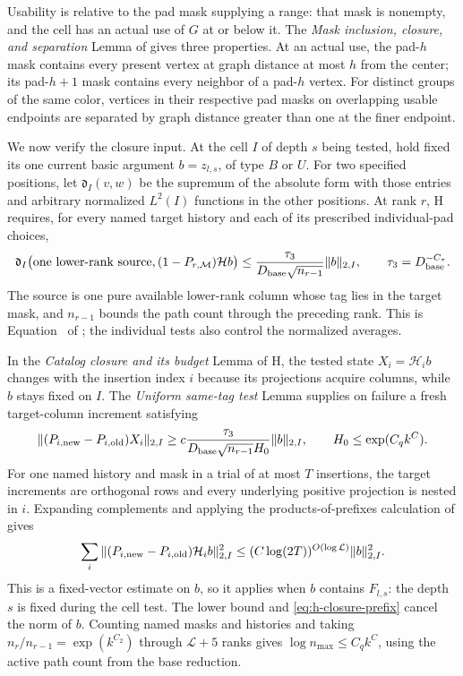 Usability is relative to the pad mask supplying a range: that mask
is nonempty, and the cell has an actual use of \(G\) at or below it.
The \emph{Mask inclusion, closure, and separation} Lemma of
\cite[Section~6]{H} gives three properties.  At an actual use, the
pad-\(h\) mask contains every present vertex at graph distance at
most \(h\) from the center; its pad-\(h+1\) mask contains every
neighbor of a pad-\(h\) vertex.  For distinct groups of the same
color, vertices in their respective pad masks on overlapping usable
endpoints are separated by graph distance greater than one at the
finer endpoint.

We now verify the closure input.  At the cell \(I\) of depth \(s\)
being tested, hold fixed its one current basic argument
\(b=z_{l,s}\), of type \(B\) or \(U\).  For two specified positions,
let \(\mathfrak d_I(v,w)\) be the supremum of the absolute form with
those entries and arbitrary normalized \(L^2(I)\) functions in the
other positions.  At rank \(r\), H requires, for every named target
history and each of its prescribed individual-pad choices,
\begin{equation}
 \mathfrak d_I\bigl(\hbox{one lower-rank source},
       (1-P_{r,\mathcal M})\mathcal H b\bigr)
 \le \frac{\tau_3}{D_{\rm base}\sqrt{n_{r-1}}}\|b\|_{2,I},
 \qquad \tau_3=D_{\rm base}^{-C_\tau}.
 \label{eq:h-closure-test}
\end{equation}
The source is one pure available lower-rank column whose tag lies
in the target mask, and \(n_{r-1}\) bounds the path count through
the preceding rank.  This is Equation~ of
\cite[Section~6]{H}; the individual tests also control the
normalized averages.

In the \emph{Catalog closure and its budget} Lemma of H, the tested
state \(X_i=\mathcal H_i b\) changes with the insertion index \(i\)
because its projections acquire columns, while \(b\) stays fixed
on \(I\).  The \emph{Uniform same-tag test} Lemma supplies on failure
a fresh target-column increment satisfying
\[
 \|(P_{i,\rm new}-P_{i,\rm old})X_i\|_{2,I}
 \ge c\frac{\tau_3}{D_{\rm base}\sqrt{n_{r-1}}H_0}\|b\|_{2,I},
 \qquad H_0\le\exp(C_qk^C).
\]
For one named history and mask in a trial of at most \(T\)
insertions, the target increments are orthogonal rows and every
underlying positive projection is nested in \(i\).  Expanding
complements and applying the products-of-prefixes calculation of
\cite[Section~3]{H} gives
\begin{equation}
 \sum_i\|(P_{i,\rm new}-P_{i,\rm old})\mathcal H_i b\|_{2,I}^2
 \le (C\log(2T))^{O(\log\mathcal L)}\|b\|_{2,I}^2.
 \label{eq:h-closure-prefix}
\end{equation}
This is a fixed-vector estimate on \(b\), so it applies when \(b\)
contains \(F_{l,s}\): the depth \(s\) is fixed during the cell test.
The lower bound and \eqref{eq:h-closure-prefix} cancel the norm of
\(b\).  Counting named masks and histories and taking
\(n_r/n_{r-1}=\exp(k^{C_2})\) through \(\mathcal L+5\) ranks gives
\(\log n_{\max}\le C_qk^C\), using the active path count from the
base reduction.

